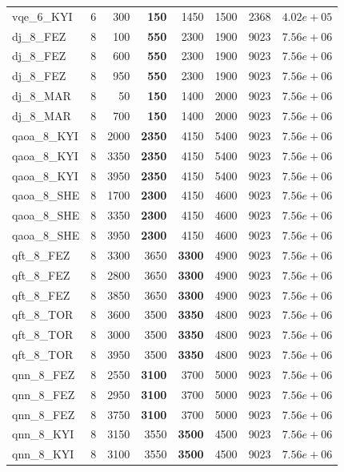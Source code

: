 \begin{table}[ht!]
\begin{tabular}{l c r r r r r r}
vqe\_6\_KYI & 6 & 300 & \textbf{150} & 1450 & 1500 & 2368 & $4.02e+05$ \\
dj\_8\_FEZ & 8 & 100 & \textbf{550} & 2300 & 1900 & 9023 & $7.56e+06$ \\
dj\_8\_FEZ & 8 & 600 & \textbf{550} & 2300 & 1900 & 9023 & $7.56e+06$ \\
dj\_8\_FEZ & 8 & 950 & \textbf{550} & 2300 & 1900 & 9023 & $7.56e+06$ \\
dj\_8\_MAR & 8 & 50 & \textbf{150} & 1400 & 2000 & 9023 & $7.56e+06$ \\
dj\_8\_MAR & 8 & 700 & \textbf{150} & 1400 & 2000 & 9023 & $7.56e+06$ \\
qaoa\_8\_KYI & 8 & 2000 & \textbf{2350} & 4150 & 5400 & 9023 & $7.56e+06$ \\
qaoa\_8\_KYI & 8 & 3350 & \textbf{2350} & 4150 & 5400 & 9023 & $7.56e+06$ \\
qaoa\_8\_KYI & 8 & 3950 & \textbf{2350} & 4150 & 5400 & 9023 & $7.56e+06$ \\
qaoa\_8\_SHE & 8 & 1700 & \textbf{2300} & 4150 & 4600 & 9023 & $7.56e+06$ \\
qaoa\_8\_SHE & 8 & 3350 & \textbf{2300} & 4150 & 4600 & 9023 & $7.56e+06$ \\
qaoa\_8\_SHE & 8 & 3950 & \textbf{2300} & 4150 & 4600 & 9023 & $7.56e+06$ \\
qft\_8\_FEZ & 8 & 3300 & 3650 & \textbf{3300} & 4900 & 9023 & $7.56e+06$ \\
qft\_8\_FEZ & 8 & 2800 & 3650 & \textbf{3300} & 4900 & 9023 & $7.56e+06$ \\
qft\_8\_FEZ & 8 & 3850 & 3650 & \textbf{3300} & 4900 & 9023 & $7.56e+06$ \\
qft\_8\_TOR & 8 & 3600 & 3500 & \textbf{3350} & 4800 & 9023 & $7.56e+06$ \\
qft\_8\_TOR & 8 & 3000 & 3500 & \textbf{3350} & 4800 & 9023 & $7.56e+06$ \\
qft\_8\_TOR & 8 & 3950 & 3500 & \textbf{3350} & 4800 & 9023 & $7.56e+06$ \\
qnn\_8\_FEZ & 8 & 2550 & \textbf{3100} & 3700 & 5000 & 9023 & $7.56e+06$ \\
qnn\_8\_FEZ & 8 & 2950 & \textbf{3100} & 3700 & 5000 & 9023 & $7.56e+06$ \\
qnn\_8\_FEZ & 8 & 3750 & \textbf{3100} & 3700 & 5000 & 9023 & $7.56e+06$ \\
qnn\_8\_KYI & 8 & 3150 & 3550 & \textbf{3500} & 4500 & 9023 & $7.56e+06$ \\
qnn\_8\_KYI & 8 & 3100 & 3550 & \textbf{3500} & 4500 & 9023 & $7.56e+06$ \\

\end{tabular}
\end{table}
